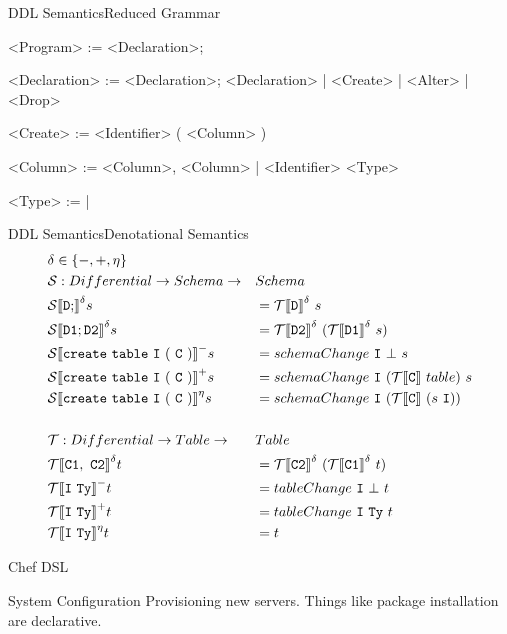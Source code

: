 \documentclass{beamer}
\newcommand{\cmp}[2]{
  \mathcal{#1}|[ \mathtt{ \StrSubstitute{#2}{ }{\ } } |]
}
\begin{document}
\begin{frame}[fragile]{DDL Semantics}{Reduced Grammar}
  \begin{grammar}
    <Program> := <Declaration>;

    <Declaration> := <Declaration>; <Declaration> | <Create> | <Alter> | <Drop>

    <Create> :=  <Identifier> ( <Column> )

    <Column> := <Column>, <Column> | <Identifier> <Type>

    <Type> :=  | 
  \end{grammar}
\end{frame}

\begin{frame}[fragile]{DDL Semantics}{Denotational Semantics}
  \footnotesize
  \begin{alignat*}{2}
  &\delta \in \{-, +, \eta \} &&\\
  &\mathcal{S} : Differential -> Schema -> &&Schema \\
  &\cmp{S}{D;}^{\delta}s &&= \cmp{T}{D}^{\delta}\ s \\
  &\cmp{S}{D1;D2}^{\delta}s &&= \cmp{T}{D2}^{\delta}\ (\cmp{T}{D1}^{\delta}\ s) \\
  &\cmp{S}{create table I ( C )}^{-}s &&= schemaChange\ \mathtt{I}\ \bot\ s\\
  &\cmp{S}{create table I ( C )}^{+}s &&= schemaChange\ \mathtt{I}\ (\cmp{T}{C}\ table) \ s \\
  &\cmp{S}{create table I ( C )}^{\eta}s &&= schemaChange\ \mathtt{I}\ (\cmp{T}{C}\ (s\ \mathtt{I})) \\
\\
  &\mathcal{T} : Differential -> Table ->&& Table\\
  &\cmp{T}{C1, C2}^{\delta}t &&= \cmp{T}{C2}^{\delta}\ (\cmp{T}{C1}^{\delta}\ t) \\
  &\cmp{T}{I Ty}^{-}t &&= tableChange\ \mathtt{I}\ \bot\ t\\
  &\cmp{T}{I Ty}^{+}t &&= tableChange\ \mathtt{I}\ \mathtt{Ty}\ t\\
  &\cmp{T}{I Ty}^{\eta}t &&= t \\
  \end{alignat*}
  \normalsize
\end{frame}

\begin{frame}[fragile]{Chef DSL}
  \begin{block}{System Configuration}
    Provisioning new servers. Things like package installation are declarative.
  \end{block}

  \begin{example}
    
  \end{example}
\end{frame}
\end{document}
